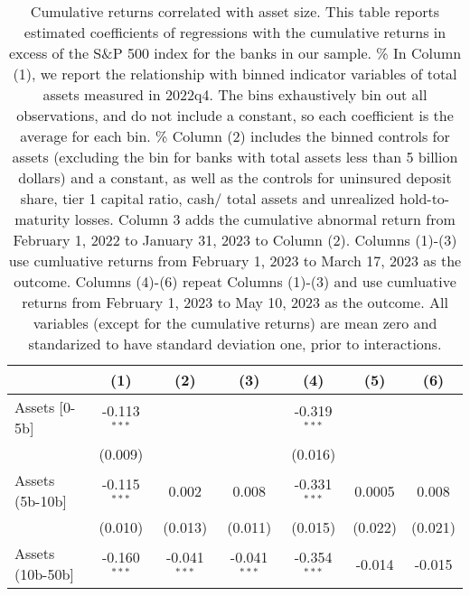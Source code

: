 
\begin{table}[htbp]
   \caption{\label{tab:dep_assets} Cumulative returns correlated with asset size. This table reports estimated coefficients of regressions with the cumulative returns in excess of the S\&P 500 index for the banks in our sample. \%
      In Column (1), we report the relationship with binned indicator variables of total assets measured in 2022q4. The bins exhaustively bin out all observations, and do not include a constant, so each coefficient is the average for each bin. \%
      Column (2) includes the binned controls for assets (excluding the bin for banks with total assets less than 5 billion dollars) and a constant, as well as the controls for uninsured deposit share, tier 1 capital ratio, cash/ total assets and unrealized hold-to-maturity losses. Column 3 adds the cumulative abnormal return from February 1, 2022 to January 31, 2023 to Column (2). Columns (1)-(3) use cumluative returns from February 1, 2023 to March 17, 2023 as the outcome. Columns (4)-(6) repeat Columns (1)-(3) and use cumluative returns from February 1, 2023 to May 10, 2023 as the outcome.
       All variables (except for the cumulative returns) are mean zero and standarized to have standard deviation one, prior to interactions.}
   \bigskip
   \centering
   \begin{adjustbox}{width = 1.2\textwidth, center}
      \begin{tabular}{lcccccc}
         \toprule
                                                & (1)            & (2)            & (3)            & (4)            & (5)            & (6)\\  
         \midrule 
         Assets [0-5b]                          & -0.113$^{***}$ &                &                & -0.319$^{***}$ &                &   \\   
                                                & (0.009)        &                &                & (0.016)        &                &   \\   
         Assets (5b-10b]                        & -0.115$^{***}$ & 0.002          & 0.008          & -0.331$^{***}$ & 0.0005         & 0.008\\   
                                                & (0.010)        & (0.013)        & (0.011)        & (0.015)        & (0.022)        & (0.021)\\   
         Assets (10b-50b]                       & -0.160$^{***}$ & -0.041$^{***}$ & -0.041$^{***}$ & -0.354$^{***}$ & -0.014         & -0.015\\   

\end{tabular}
\end{adjustbox}
\end{table}
